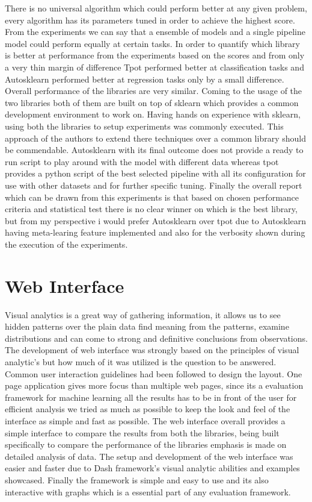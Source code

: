 There is no universal algorithm which could perform better at any given problem, every algorithm has its parameters tuned in order to achieve the highest score. From the experiments we can say that a ensemble of models and a single pipeline model could perform equally at certain tasks. In order to quantify which library is better at performance from the experiments based on the scores and from only a very thin margin of difference Tpot performed better at classification tasks and Autosklearn performed better at regression tasks only by a small difference. Overall performance of the libraries are very similar. Coming to the usage of the two libraries both of them are built on top of sklearn\cite{scikit-learn} which provides a common development environment to work on. Having hands on experience with sklearn, using both the libraries to setup experiments was commonly executed. This approach of the authors to extend there techniques over a common library should be commendable. Autosklearn with its final outcome does not provide a ready to run script to play around with the model with different data whereas tpot provides a python script of the best selected pipeline with all its configuration for use with other datasets and for further specific tuning. Finally the overall report which can be drawn from this experiments is that based on chosen performance criteria and statistical test there is no clear winner on which is the best library, but from my perspective i would prefer Autosklearn over tpot due to Autosklearn having meta-learing feature implemented and also for the verbosity shown during the execution of the experiments.

\section{Web Interface}

Visual analytics is a great way of gathering information, it allows us to see hidden patterns over the plain data find meaning from the patterns, examine distributions and can come to strong and definitive conclusions from observations. The development of web interface was strongly based on the principles of visual analytic's but how much of it was utilized is the question to be answered. Common user interaction guidelines had been followed to design the layout. One page application gives more focus than multiple web pages, since its a evaluation framework for machine learning all the results has to be in front of the user for efficient analysis we tried as much as possible to keep the look and feel of the interface as simple and fast as possible. The web interface overall provides a simple interface to compare the results from both the libraries, being built specifically to compare the performance of the libraries emphasis is made on detailed analysis of data. The setup and development of the web interface was easier and faster due to  Dash framework's visual analytic abilities and examples showcased. Finally the framework is simple and easy to use and its also interactive with graphs which is a essential part of any evaluation framework.